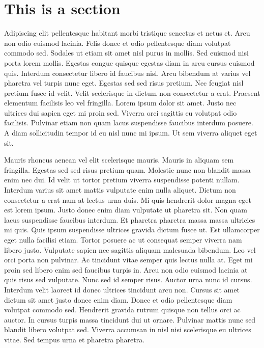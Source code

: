 \section{This is a section}

Adipiscing elit pellentesque habitant morbi tristique senectus et netus et. Arcu non odio euismod lacinia. Felis donec et odio pellentesque diam volutpat commodo sed. Sodales ut etiam sit amet nisl purus in mollis. Sed euismod nisi porta lorem mollis. Egestas congue quisque egestas diam in arcu cursus euismod quis. Interdum consectetur libero id faucibus nisl. Arcu bibendum at varius vel pharetra vel turpis nunc eget. Egestas sed sed risus pretium. Nec feugiat nisl pretium fusce id velit. Velit scelerisque in dictum non consectetur a erat. Praesent elementum facilisis leo vel fringilla. Lorem ipsum dolor sit amet. Justo nec ultrices dui sapien eget mi proin sed. Viverra orci sagittis eu volutpat odio facilisis. Pulvinar etiam non quam lacus suspendisse faucibus interdum posuere. A diam sollicitudin tempor id eu nisl nunc mi ipsum. Ut sem viverra aliquet eget sit. \par

Mauris rhoncus aenean vel elit scelerisque mauris. Mauris in aliquam sem fringilla. Egestas sed sed risus pretium quam. Molestie nunc non blandit massa enim nec dui. Id velit ut tortor pretium viverra suspendisse potenti nullam. Interdum varius sit amet mattis vulputate enim nulla aliquet. Dictum non consectetur a erat nam at lectus urna duis. Mi quis hendrerit dolor magna eget est lorem ipsum. Justo donec enim diam vulputate ut pharetra sit. Non quam lacus suspendisse faucibus interdum. Et pharetra pharetra massa massa ultricies mi quis. Quis ipsum suspendisse ultrices gravida dictum fusce ut. Est ullamcorper eget nulla facilisi etiam. Tortor posuere ac ut consequat semper viverra nam libero justo. Vulputate sapien nec sagittis aliquam malesuada bibendum. Leo vel orci porta non pulvinar. Ac tincidunt vitae semper quis lectus nulla at. Eget mi proin sed libero enim sed faucibus turpis in. Arcu non odio euismod lacinia at quis risus sed vulputate. Nunc sed id semper risus. Auctor urna nunc id cursus. Interdum velit laoreet id donec ultrices tincidunt arcu non. Cursus sit amet dictum sit amet justo donec enim diam. Donec et odio pellentesque diam volutpat commodo sed. Hendrerit gravida rutrum quisque non tellus orci ac auctor. In cursus turpis massa tincidunt dui ut ornare. Pulvinar mattis nunc sed blandit libero volutpat sed. Viverra accumsan in nisl nisi scelerisque eu ultrices vitae. Sed tempus urna et pharetra pharetra.\par

